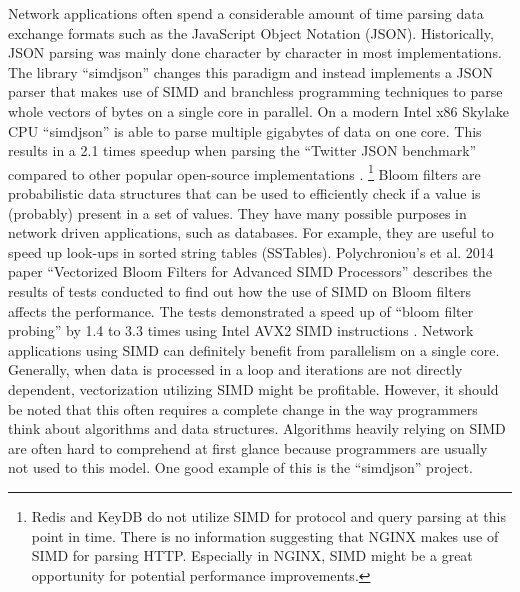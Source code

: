 \newline Network applications often spend a considerable amount of time parsing data exchange formats such as the JavaScript Object Notation (JSON). Historically, JSON parsing was mainly done character by character in most implementations. The library “simdjson” changes this paradigm and instead implements a JSON parser that makes use of SIMD and branchless programming techniques to parse whole vectors of bytes on a single core in parallel. On a modern Intel x86 Skylake CPU “simdjson” is able to parse multiple gigabytes of data on one core. This results in a 2.1 times speedup when parsing the “Twitter JSON benchmark” compared to other popular open-source implementations \cite{langdale:simdjson}.
\footnote{Redis and KeyDB do not utilize SIMD for protocol and query parsing at this point in time. There is no information suggesting that NGINX makes use of SIMD for parsing HTTP. Especially in NGINX, SIMD might be a great opportunity for potential performance improvements.} \newline
Bloom filters are probabilistic data structures that can be used to efficiently check if a value is (probably) present in a set of values. They have many possible purposes in network driven applications, such as databases. For example, they are useful to speed up look-ups in sorted string tables (SSTables). Polychroniou’s et al. 2014 paper “Vectorized Bloom Filters for Advanced SIMD Processors” describes the results of tests conducted to find out how the use of SIMD on Bloom filters affects the performance. The tests demonstrated a speed up of “bloom filter probing” by 1.4 to 3.3 times using Intel AVX2 SIMD instructions \cite{polross:bloom}. \newline
Network applications using SIMD can definitely benefit from parallelism on a single core. Generally, when data is processed in a loop and iterations are not directly dependent, vectorization utilizing SIMD might be profitable. However, it should be noted that this often requires a complete change in the way programmers think about algorithms and data structures. Algorithms heavily relying on SIMD are often hard to comprehend at first glance because programmers are usually not used to this model. One good example of this is the “simdjson” project.
